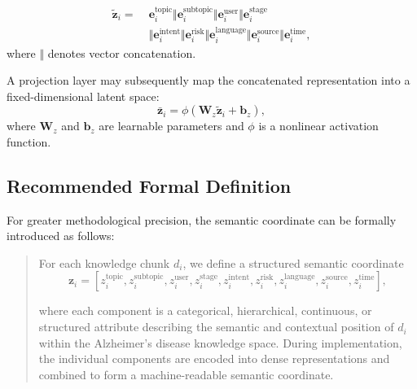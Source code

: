 \documentclass{article}
\begin{document}
\begin{equation}
\begin{split}
    \widetilde{\mathbf{z}}_i
    =\;&
    \mathbf{e}_i^{\mathrm{topic}}
    \Vert
    \mathbf{e}_i^{\mathrm{subtopic}}
    \Vert
    \mathbf{e}_i^{\mathrm{user}}
    \Vert
    \mathbf{e}_i^{\mathrm{stage}}\\
    &\Vert
    \mathbf{e}_i^{\mathrm{intent}}
    \Vert
    \mathbf{e}_i^{\mathrm{risk}}
    \Vert
    \mathbf{e}_i^{\mathrm{language}}
    \Vert
    \mathbf{e}_i^{\mathrm{source}}
    \Vert
    \mathbf{e}_i^{\mathrm{time}},
\end{split}
\end{equation}
where $\Vert$ denotes vector concatenation.

A projection layer may subsequently map the concatenated representation into a fixed-dimensional latent space:
\begin{equation}
    \bar{\mathbf{z}}_i
    =
    \phi
    \left(
    \mathbf{W}_z
    \widetilde{\mathbf{z}}_i
    +
    \mathbf{b}_z
    \right),
\end{equation}
where $\mathbf{W}_z$ and $\mathbf{b}_z$ are learnable parameters and $\phi$
is a nonlinear activation function.

\subsection{Recommended Formal Definition}
For greater methodological precision, the semantic coordinate can be formally introduced as follows:
\begin{quote}
For each knowledge chunk $d_i$, we define a structured semantic coordinate
\begin{equation}
    \mathbf{z}_i =
    \left[
    z_i^{\mathrm{topic}},
    z_i^{\mathrm{subtopic}},
    z_i^{\mathrm{user}},
    z_i^{\mathrm{stage}},
    z_i^{\mathrm{intent}},
    z_i^{\mathrm{risk}},
    z_i^{\mathrm{language}},
    z_i^{\mathrm{source}},
    z_i^{\mathrm{time}}
    \right],
\end{equation}

where each component is a categorical, hierarchical, continuous, or structured attribute describing the semantic and contextual position of $d_i$ within the Alzheimer's disease knowledge space. During implementation, the individual components are encoded into dense representations and combined to form a machine-readable semantic coordinate.
\end{quote}
\end{document}

